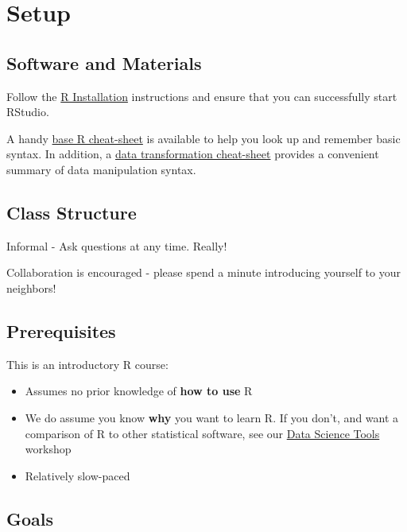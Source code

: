 \documentclass[
]{book}
\providecommand{\tightlist}{%
  \setlength{\itemsep}{0pt}\setlength{\parskip}{0pt}}
\begin{document}
\hypertarget{setup}{%
\section{Setup}\label{setup}}

\hypertarget{software-and-materials}{%
\subsection{Software and Materials}\label{software-and-materials}}

Follow the \href{./Rinstall.html}{R Installation} instructions and ensure that you can successfully start RStudio.

A handy \href{R/Rintro/base-r-cheat-sheet.pdf}{base R cheat-sheet} is available to help you look up and remember basic syntax. In addition, a \href{R/Rintro/data-transformation-cheat-sheet.pdf}{data transformation cheat-sheet} provides a convenient summary of data manipulation syntax.

\hypertarget{class-structure}{%
\subsection{Class Structure}\label{class-structure}}

Informal - Ask questions at any time. Really!

Collaboration is encouraged - please spend a minute introducing yourself to your neighbors!

\hypertarget{prerequisites}{%
\subsection{Prerequisites}\label{prerequisites}}

This is an introductory R course:

\begin{itemize}
\tightlist
\item
  Assumes no prior knowledge of \textbf{how to use} R
\item
  We do assume you know \textbf{why} you want to learn R. If you don't, and want a comparison of R to other statistical software, see our \href{./DataScienceTools.html}{Data Science Tools} workshop
\item
  Relatively slow-paced
\end{itemize}

\hypertarget{goals}{%
\subsection{Goals}\label{goals}}
\end{document}
